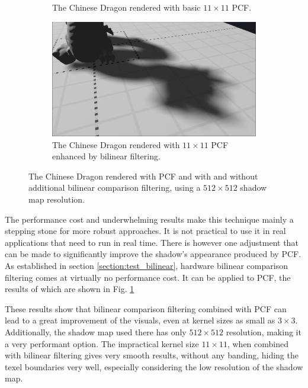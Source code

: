 \begin{figure}[h]
\begin{subfigure}[t]{0.45\textwidth}
        \caption{The Chinese Dragon rendered with basic \(11\times 11\) PCF.}
    \end{subfigure}
	\hfill
    \begin{subfigure}[t]{0.45\textwidth}
		\centering
        \includegraphics[width=\textwidth]{./graf/tests/pcf/cropped/dragon_pcf_fhd_512_11x11_bilinear.png}
        \caption{The Chinese Dragon rendered with \(11\times 11\) PCF enhanced by bilinear filtering.}
    \end{subfigure}

    \caption{The Chinese Dragon rendered with PCF and with and without additional bilinear comparison filtering, using a \(512\times 512\) shadow map resolution.}
    \label{fig:test_pfc_bilinear_dragon_screens}
\end{figure}

The performance cost and underwhelming results make this technique mainly a stepping stone for more robust approaches. It is not practical to use it in real applications that need to run in real time. There is however one adjustment that can be made to significantly improve the shadow's appearance produced by PCF. As established in section \ref{section:test_bilinear}, hardware bilinear comparison filtering comes at virtually no performance cost. It can be applied to PCF, the results of which are shown in Fig. \ref{fig:test_pfc_bilinear_dragon_screens}

These results show that bilinear comparison filtering combined with PCF can lead to a great improvement of the visuals, even at kernel sizes as small as \(3\times 3\). Additionally, the shadow map used there has only \(512\times 512\) resolution, making it a very performant option. The impractical kernel size \(11\times 11\), when combined with bilinear filtering gives very smooth results, without any banding, hiding the texel boundaries very well, especially considering the low resolution of the shadow map.

